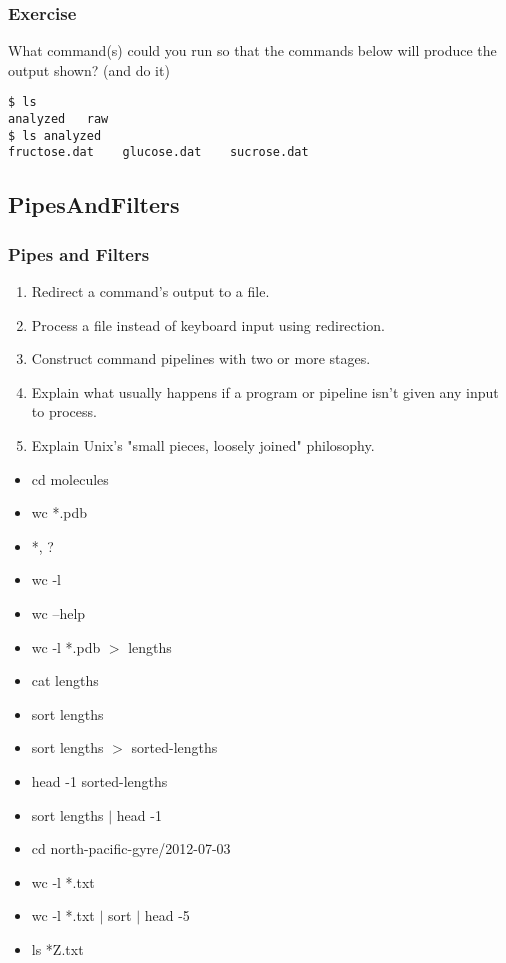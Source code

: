 \documentclass[xcolor=dvipsnames]{beamer}
\begin{document}
\begin{frame}[fragile]
\frametitle{Exercise}
What command(s) could you run so that the commands below will produce the output shown? (and do it)
\begin{verbatim}
$ ls
analyzed   raw
$ ls analyzed
fructose.dat    glucose.dat    sucrose.dat
\end{verbatim}
\end{frame}

\subsection{PipesAndFilters}
\begin{frame}
\frametitle{Pipes and Filters}
\begin{enumerate}

\item    Redirect a command's output to a file.
\item    Process a file instead of keyboard input using redirection.
\item    Construct command pipelines with two or more stages.
\item    Explain what usually happens if a program or pipeline isn't given any input to process.
\item    Explain Unix's "small pieces, loosely joined" philosophy.

\end{enumerate}
\begin{multicols}{2}
\begin{itemize}
\item cd molecules
\item wc *.pdb
\item *, ?
\item wc -l
\item wc --help
\item wc -l *.pdb $>$ lengths
\item cat lengths
\item sort lengths
\item sort lengths $>$ sorted-lengths
\item head -1 sorted-lengths
\item sort lengths $|$ head -1
\item cd north-pacific-gyre/2012-07-03
\item wc -l *.txt
\item wc -l *.txt $|$ sort $|$ head -5
\item ls *Z.txt
\end{itemize}
\end{multicols}
\end{frame}
\end{document}
